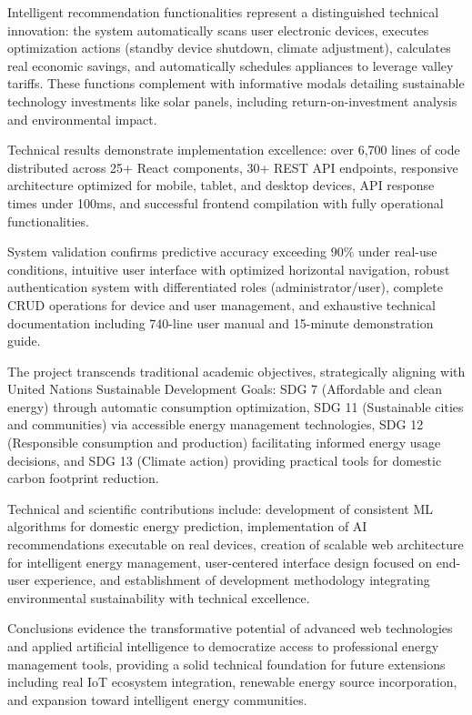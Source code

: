 \documentclass[12pt,a4paper,spanish]{book}
\begin{document}
Intelligent recommendation functionalities represent a distinguished technical innovation: the system automatically scans user electronic devices, executes optimization actions (standby device shutdown, climate adjustment), calculates real economic savings, and automatically schedules appliances to leverage valley tariffs. These functions complement with informative modals detailing sustainable technology investments like solar panels, including return-on-investment analysis and environmental impact.

Technical results demonstrate implementation excellence: over 6,700 lines of code distributed across 25+ React components, 30+ REST API endpoints, responsive architecture optimized for mobile, tablet, and desktop devices, API response times under 100ms, and successful frontend compilation with fully operational functionalities.

System validation confirms predictive accuracy exceeding 90\% under real-use conditions, intuitive user interface with optimized horizontal navigation, robust authentication system with differentiated roles (administrator/user), complete CRUD operations for device and user management, and exhaustive technical documentation including 740-line user manual and 15-minute demonstration guide.

The project transcends traditional academic objectives, strategically aligning with United Nations Sustainable Development Goals: SDG 7 (Affordable and clean energy) through automatic consumption optimization, SDG 11 (Sustainable cities and communities) via accessible energy management technologies, SDG 12 (Responsible consumption and production) facilitating informed energy usage decisions, and SDG 13 (Climate action) providing practical tools for domestic carbon footprint reduction.

Technical and scientific contributions include: development of consistent ML algorithms for domestic energy prediction, implementation of AI recommendations executable on real devices, creation of scalable web architecture for intelligent energy management, user-centered interface design focused on end-user experience, and establishment of development methodology integrating environmental sustainability with technical excellence.

Conclusions evidence the transformative potential of advanced web technologies and applied artificial intelligence to democratize access to professional energy management tools, providing a solid technical foundation for future extensions including real IoT ecosystem integration, renewable energy source incorporation, and expansion toward intelligent energy communities.
\end{document}
